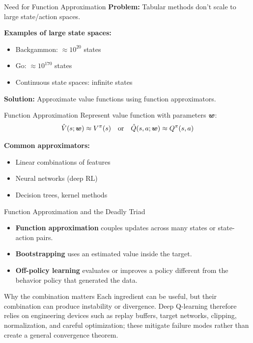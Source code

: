 \documentclass[aspectratio=169]{beamer}
\begin{document}
\begin{frame}{Need for Function Approximation}
  \textbf{Problem:} Tabular methods don't scale to large state/action spaces.

  \vspace{0.5em}

  \textbf{Examples of large state spaces:}
  \begin{itemize}
    \item Backgammon: $\approx 10^{20}$ states
    \item Go: $\approx 10^{170}$ states
    \item Continuous state spaces: infinite states
  \end{itemize}

  \vspace{0.5em}

  \textbf{Solution:} Approximate value functions using function approximators.

  \vspace{0.5em}

  \begin{definitionbox}{Function Approximation}
    Represent value function with parameters $\boldsymbol{w}$:
    $$\hat{V}(s; \boldsymbol{w}) \approx V^\pi(s) \quad \text{or} \quad \hat{Q}(s,a; \boldsymbol{w}) \approx Q^\pi(s,a)$$
  \end{definitionbox}

  \vspace{0.5em}

  \textbf{Common approximators:}
  \begin{itemize}
    \item Linear combinations of features
    \item Neural networks (deep RL)
    \item Decision trees, kernel methods
  \end{itemize}
\end{frame}

\begin{frame}{Function Approximation and the Deadly Triad}
  \begin{itemize}
    \item \textbf{Function approximation} couples updates across many states or state-action pairs.
    \item \textbf{Bootstrapping} uses an estimated value inside the target.
    \item \textbf{Off-policy learning} evaluates or improves a policy different from the behavior policy that generated the data.
  \end{itemize}

  \begin{alertbox}{Why the combination matters}
    Each ingredient can be useful, but their combination can produce instability or divergence. Deep Q-learning therefore relies on engineering devices such as replay buffers, target networks, clipping, normalization, and careful optimization; these mitigate failure modes rather than create a general convergence theorem.
  \end{alertbox}
\end{frame}
\end{document}
